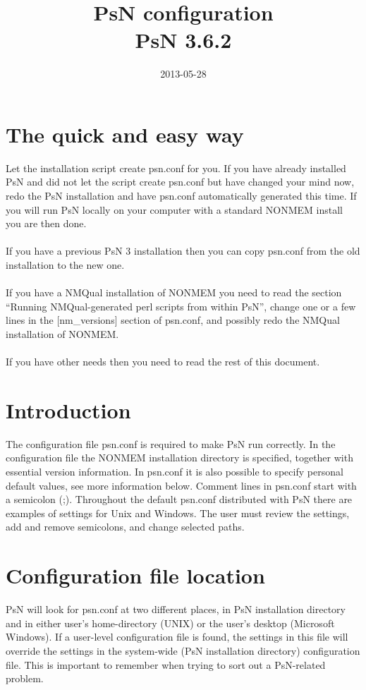 \documentclass[a4paper,12pt]{article}
\title{PsN configuration\\ \vspace{2 mm} {\large PsN 3.6.2}}
\date{2013-05-28}
\begin{document}
\maketitle

\section{The quick and easy way}
Let the installation script create psn.conf for you. If you have already installed PsN and did not let the script create psn.conf but have changed your mind now, redo the PsN installation and have psn.conf automatically generated this time. If you will run PsN locally on your computer with a standard NONMEM install you are then done.
\\
\\
If you have a previous PsN 3 installation then you can copy psn.conf from the old installation to the new one.
\\
\\
If you have a NMQual installation of NONMEM you need to read the section  “Running  NMQual-generated perl scripts from within PsN”, change one or a few lines in the [nm\_versions] section of psn.conf, and possibly redo the NMQual installation of NONMEM. 
\\
\\
If you have other needs then you need to read the rest of this document.

\section{Introduction}
The configuration file psn.conf is required to make PsN run correctly. In the configuration file the NONMEM installation directory is specified, together with essential version information. In psn.conf it is also possible to specify personal default values, see more information below. Comment lines in psn.conf start with a semicolon (;). Throughout the default psn.conf distributed with PsN there are examples of settings for Unix and Windows. The user must review the settings, add and remove semicolons, and change selected paths.

\section{Configuration file location}
PsN will look for psn.conf at two different places, in PsN installation directory and in either
user's home-directory (UNIX) or the user's desktop (Microsoft Windows). If a user-level configuration file is found, the settings in this file will override the settings in the system-wide (PsN installation directory) configuration file. This is important to remember when trying to sort out a PsN-related problem.
\end{document}
